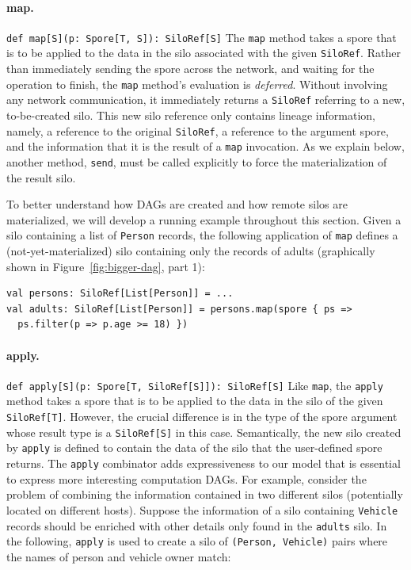 \documentclass{jfp1}
\begin{document}
\paragraph{map.}%
%
\texttt{def map[S](p: Spore[T, S]): SiloRef[S]} \newline
%
The \verb|map| method takes a spore that is to be applied to the data in the
silo associated with the given \verb|SiloRef|. Rather than immediately sending
the spore across the network, and waiting for the operation to finish, the
\verb|map| method's evaluation is {\em deferred}. Without involving any network
communication, it immediately returns a \verb|SiloRef| referring to a new,
to-be-created silo. This new silo reference only contains lineage information,
namely, a reference to the original \verb|SiloRef|, a reference to the argument
spore, and the information that it is the result of a \verb|map| invocation. As
we explain below, another method, \verb|send|, must be called
explicitly to force the materialization of the result silo.

To better understand how DAGs are created and how remote silos are materialized,
we will develop a running example throughout this section. Given a silo
containing a list of \verb|Person| records, the following application of
\verb|map| defines a (not-yet-materialized) silo containing only the records of
adults (graphically shown in Figure~\ref{fig:bigger-dag}, part 1):

\begin{lstlisting}
val persons: SiloRef[List[Person]] = ...
val adults: SiloRef[List[Person]] = persons.map(spore { ps =>
  ps.filter(p => p.age >= 18) })
\end{lstlisting}


\paragraph{apply.}%
%
\texttt{def apply[S](p: Spore[T, SiloRef[S]]): SiloRef[S]} \newline
%
Like \verb|map|, the \verb|apply| method takes a spore that is to be applied
to the data in the silo of the given \verb|SiloRef[T]|. However, the crucial
difference is in the type of the spore argument whose result type is a
\verb|SiloRef[S]| in this case. Semantically, the new silo created by
\verb|apply| is defined to contain the data of the silo that the user-defined
spore returns. The \verb|apply| combinator adds expressiveness to our model
that is essential to express more interesting computation DAGs. For example,
consider the problem of combining the information contained in two different
silos (potentially located on different hosts). Suppose the information of a
silo containing \verb|Vehicle| records should be enriched with other details
only found in the \verb|adults| silo. In the following, \verb|apply| is used
to create a silo of \verb|(Person, Vehicle)| pairs where the names of person and
vehicle owner match:
\end{document}
